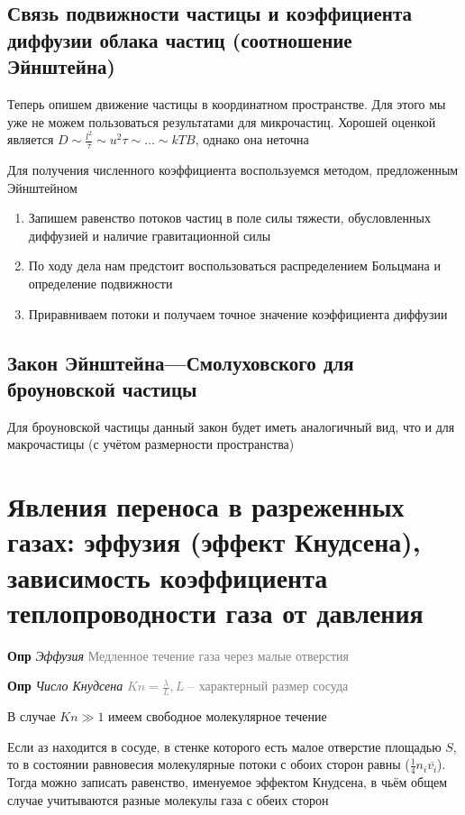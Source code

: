 \documentclass[a4paper, 14pt]{article}
\begin{document}
    \subsection{Связь подвижности частицы и коэффициента диффузии облака частиц (соотношение Эйнштейна)}
    
    Теперь опишем движение частицы в координатном пространстве.
    Для этого мы уже не можем пользоваться результатами для микрочастиц.
    Хорошей оценкой является $D \sim \frac{l^2}{\tau} \sim u^2 \tau \sim \dots \sim kTB$, однако она неточна
    
    Для получения численного коэффициента воспользуемся методом, предложенным Эйнштейном
    \begin{enumerate}
        \item Запишем равенство потоков частиц в поле силы тяжести, обусловленных диффузией и наличие гравитационной
        силы
        \item По ходу дела нам предстоит воспользоваться распределением Больцмана и определение подвижности
        \item Приравниваем потоки и получаем точное значение коэффициента диффузии
    \end{enumerate}
    
    \subsection{Закон Эйнштейна—Смолуховского для броуновской частицы}
    
    Для броуновской частицы данный закон будет иметь аналогичный вид, что и для макрочастицы (с учётом размерности
    пространства)
    
    \section{Явления переноса в разреженных газах: эффузия (эффект Кнудсена), зависимость коэффициента
    теплопроводности газа от давления}
    
    \textbf{Опр} \textit{Эффузия} \textcolor{gray}{Медленное течение газа через малые отверстия}
    
    \textbf{Опр} \textit{Число Кнудсена} \textcolor{gray}{$Kn = \frac{\lambda}{L}, L$ -- характерный размер сосуда}
    
    В случае $Kn \gg 1$ имеем свободное молекулярное течение
    
    Если аз находится в сосуде, в стенке которого есть малое отверстие площадью $S$, то в состоянии равновесия
    молекулярные потоки с обоих сторон равны ($\frac{1}{4} n_i \overline{v_i}$).
    Тогда можно записать равенство, именуемое эффектом Кнудсена, в чьём общем случае учитываются разные молекулы газа
    с обеих сторон
    
\end{document}
